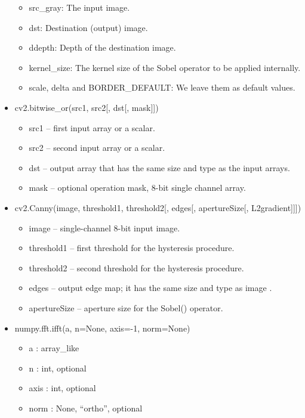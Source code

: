 \documentclass[11pt]{ctexart}
\begin{document}
\begin{itemize}
\begin{itemize}
        \item src\_gray: The input image.
        \item dst: Destination (output) image.
        \item ddepth: Depth of the destination image.
        \item kernel\_size: The kernel size of the Sobel operator to be applied internally.
        \item scale, delta and BORDER\_DEFAULT: We leave them as default values.
    \end{itemize}
    \item cv2.bitwise\_or(src1, src2[, dst[, mask]])
    \begin{itemize}
        \item src1 – first input array or a scalar.
        \item src2 – second input array or a scalar.
        \item dst – output array that has the same size and type as the input arrays.
        \item mask – optional operation mask, 8-bit single channel array.
    \end{itemize}
    \item cv2.Canny(image, threshold1, threshold2[, edges[, apertureSize[, L2gradient]]])
    \begin{itemize}
        \item image – single-channel 8-bit input image.
        \item threshold1 – first threshold for the hysteresis procedure.
        \item threshold2 – second threshold for the hysteresis procedure.
        \item edges – output edge map; it has the same size and type as image .
        \item apertureSize – aperture size for the Sobel() operator.
    \end{itemize}
    \item numpy.fft.ifft(a, n=None, axis=-1, norm=None)
    \begin{itemize}
        \item a : array\_like
        \item n : int, optional
        \item axis : int, optional
        \item norm : {None, “ortho”}, optional
    \end{itemize}
\end{itemize}
\end{document}
